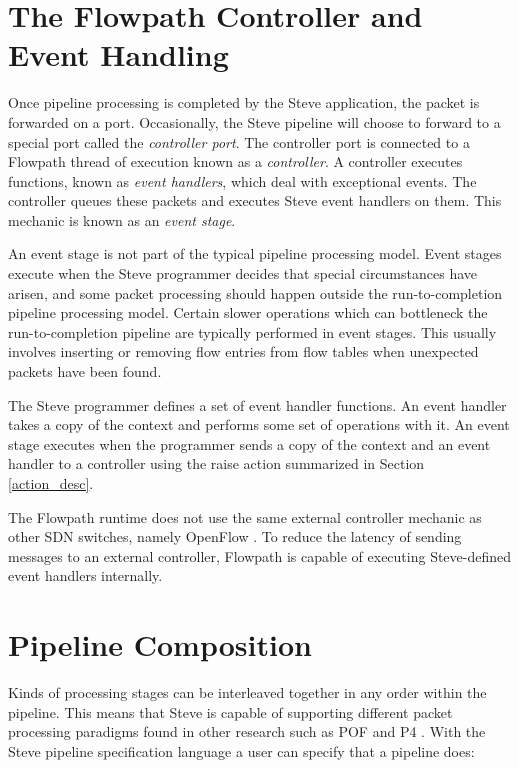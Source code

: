 \section{The Flowpath Controller and Event Handling} \label{events_desc}

Once pipeline processing is completed by the Steve application, the packet is
forwarded on a port. Occasionally, the Steve pipeline will choose to forward to
a special port called the \emph{controller port}. The controller port is
connected to a Flowpath thread of execution known as a \emph{controller}. A
controller executes functions, known as \emph{event handlers}, which deal with
exceptional events. The controller queues these packets and executes Steve event
handlers on them. This mechanic is known as an \emph{event stage}.

An event stage is not part of the typical pipeline processing model.
Event stages execute when the Steve programmer decides that special
circumstances have arisen, and some packet processing should happen outside the
run-to-completion pipeline processing model. Certain slower operations which can
bottleneck the run-to-completion pipeline are typically performed in event
stages. This usually involves inserting or removing flow entries from flow
tables when unexpected packets have been found.

The Steve programmer defines a set of event handler functions. An event handler
takes a copy of the context and performs some set of operations with it. An
event stage executes when the programmer sends a copy of the context and an
event handler to a controller using the raise action summarized in Section
\ref{action_desc}.

The Flowpath runtime does not use the same external controller mechanic as other
SDN switches, namely OpenFlow \cite{openflow_spec}. To reduce the latency of
sending messages to an external controller, Flowpath is capable of executing
Steve-defined event handlers internally.

\section{Pipeline Composition} \label{pipeline_comp_desc}

Kinds of processing stages can be interleaved together in any order within the
pipeline. This means that Steve is capable of supporting different packet
processing paradigms found in other research such as POF \cite{pof, pof_fis,
pof_impl} and P4 \cite{p4_spec, p4_spec2}. With the Steve pipeline specification
language a user can specify that a pipeline does:

